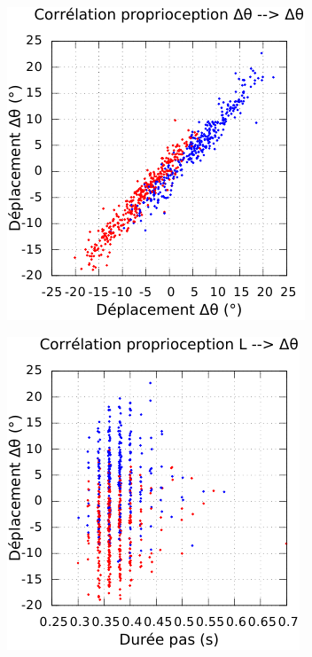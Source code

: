 \begin{figure}[htbp]
\begin{subfigure}{0.22\paperwidth}
    \end{subfigure}
    \begin{subfigure}{0.22\paperwidth}
        \centering
        \includegraphics[type=pdf,ext=.pdf,read=.pdf,width=1.0\linewidth]{../plot/OdometryLWPR/grass_close_function_read_yaw_yaw}
    \end{subfigure}
    \begin{subfigure}{0.22\paperwidth}
        \centering
        \includegraphics[type=pdf,ext=.pdf,read=.pdf,width=1.0\linewidth]{../plot/OdometryLWPR/grass_close_function_read_len_yaw}

\end{subfigure}
\end{figure}
